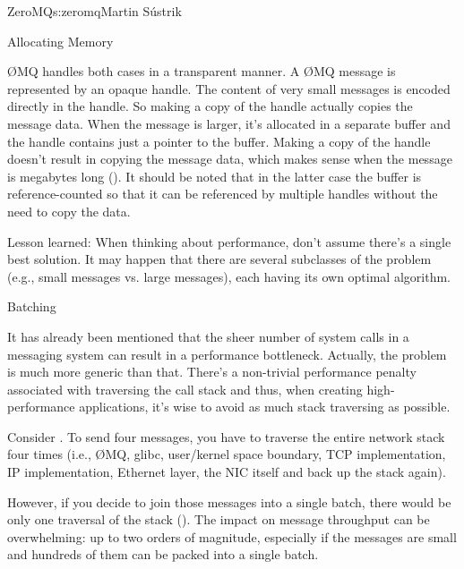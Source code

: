 \begin{aosachapter}{ZeroMQ}{s:zeromq}{Martin S\'{u}strik}
\begin{aosasect1}{Allocating Memory}

{\O}MQ handles both cases in a transparent manner. A {\O}MQ message is
represented by an opaque handle. The content of very small messages is
encoded directly in the handle. So making a copy of the handle
actually copies the message data. When the message is larger, it's
allocated in a separate buffer and the handle contains just a pointer to
the buffer. Making a copy of the handle doesn't result in copying the
message data, which makes sense when the message
is megabytes long (). It should be noted
that in the latter case the buffer is reference-counted so that it can
be referenced by multiple handles without the need to copy the data.

Lesson learned: When thinking about performance, don't assume there's
a single best solution. It may happen that there are several
subclasses of the problem (e.g., small messages vs. large messages),
each having its own optimal algorithm.

\end{aosasect1}

\begin{aosasect1}{Batching}

It has already been mentioned that the sheer number of system calls in
a messaging system can result in a performance bottleneck. Actually,
the problem is much more generic than that. There's a non-trivial
performance penalty associated with traversing the call stack and
thus, when creating high-performance applications, it's wise to avoid
as much stack traversing as possible.


Consider .  To send four messages, you
have to traverse the entire network stack four times (i.e., {\O}MQ, glibc,
user/kernel space boundary, TCP implementation, IP implementation,
Ethernet layer, the NIC itself and back up the stack again). 

However,
if you decide to join those messages into a single batch, there would
be only one traversal of the stack ().
The impact on message throughput can be overwhelming: up to two orders
of magnitude, especially if the messages are small and hundreds of
them can be packed into a single batch.



\end{aosasect1}
\end{aosachapter}
